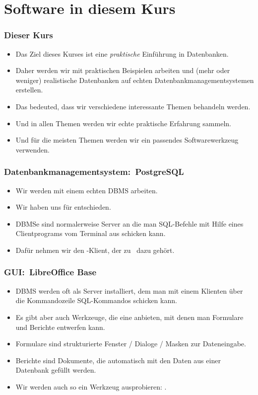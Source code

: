 \documentclass[aspectratio=169,mathserif,notheorems]{beamer}%
\begin{document}
\section{Software in diesem Kurs}%
%
\begin{frame}%
\frametitle{Dieser Kurs}%
\begin{itemize}%
\item Das Ziel dieses Kurses ist eine \emph{praktische} Einführung in Datenbanken.%
\item<2-> Daher werden wir mit praktischen Beispielen arbeiten und (mehr oder weniger) realistische Datenbanken auf echten Datenbankmanagementsystemen erstellen.%
\item<3-> Das bedeuted, dass wir verschiedene interessante Themen behandeln werden.%
\item<4-> Und in allen Themen werden wir echte praktische Erfahrung sammeln.%
\item<5-> Und für die meisten Themen werden wir ein passendes Softwarewerkzeug verwenden.%
\end{itemize}%
\end{frame}%
%
\begin{frame}[t]%
\frametitle{Datenbankmanagementsystem:~PostgreSQL}%
\begin{itemize}%
\item Wir werden mit einem echten DBMS arbeiten.%
\item<2-> Wir haben uns für \postgresql\cite{TA2024DDAMWPAM,FP2023LP,OH2017PUAR,B2024PELUYDW} entschieden.%
\item<3-> DBMSe sind normalerweise Server an die man SQL-Befehle mit Hilfe eines Clientprograms vom Terminal aus schicken kann.%
\item<4-> Dafür nehmen wir den \psql-Klient, der zu \postgresql\ dazu gehört.%
\end{itemize}%
%
%
\end{frame}%
%
\begin{frame}[t]%
\frametitle{GUI:~LibreOffice Base}%
\begin{itemize}%
\item DBMS werden oft als Server installiert, dem man mit einem Klienten über die Kommandozeile SQL-Kommandos schicken kann.%
\item<2-> Es gibt aber auch Werkzeuge, die eine  anbieten, mit denen man Formulare und Berichte entwerfen kann.
\item<3-> Formulare sind strukturierte Fenster / Dialoge / Masken zur Dateneingabe.%
\item<4-> Berichte sind Dokumente, die automatisch mit den Daten aus einer Datenbank gefüllt werden.%
\item<5-> Wir werden auch so ein Werkzeug ausprobieren: \libreofficeBase\cite{FNFHWSKLSSGLFRSRPLJG2022BG7R1BOL7C,S2022L7PFEUU}.%
\end{itemize}%
%
%
\end{frame}%
\end{document}
